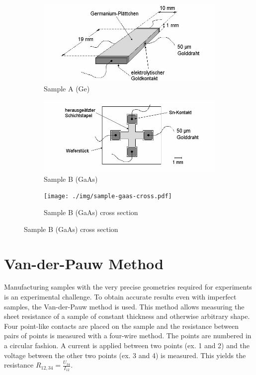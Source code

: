\begin{figure}
	\centering
	\begin{subfigure}{0.45\textwidth}
		\centering
		\includegraphics[width=\textwidth]{./img/sample-ge.png}
		\caption{Sample A (Ge)}
		\label{fig:samples:ge}
	\end{subfigure}
	\begin{subfigure}{0.45\textwidth}
		\centering
		\includegraphics[width=\textwidth]{./img/sample-gaas-clover.png}
		\caption{Sample B (GaAs)}
		\label{fig:samples:gaas-clover}
	\end{subfigure}
	\begin{subfigure}{0.7\textwidth}
		\centering
		\texttt{[image: ./img/sample-gaas-cross.pdf]}
		\caption{Sample B (GaAs) cross section}
		\label{fig:samples:gaas-cross}
	\end{subfigure}
\end{figure}

\section{Van-der-Pauw Method}\label{sec:van-der-pauw-geometry}
Manufacturing samples with the very precise geometries required for experiments is an experimental challenge.
To obtain accurate results even with imperfect samples, the Van-der-Pauw method is used.
This method allows measuring the sheet resistance of a sample of constant thickness and otherwise arbitrary shape.
Four point-like contacts are placed on the sample and the resistance between pairs of points is measured with a four-wire method.
The points are numbered in a circular fashion.
A current is applied between two points (ex. 1 and 2) and the voltage between the other two points (ex. 3 and 4) is measured.
This yields the resistance $R_{12,34} = \frac{U_{34}}{I_{12}}$.

